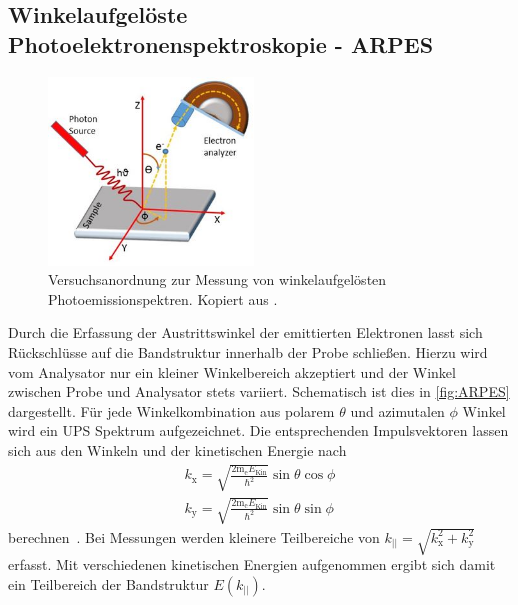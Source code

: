         \FloatBarrier
        \subsection{Winkelaufgelöste Photoelektronenspektroskopie - ARPES} \label{sec:ARPES}
            \begin{figure}
                \centering
                \includegraphics[height=5cm]{ARPES.jpg}
                \caption{Versuchsanordnung zur Messung von winkelaufgelösten Photoemissionspektren. Kopiert aus \cite{ARPES}.}
                \label{fig:ARPES}
            \end{figure}
            Durch die Erfassung der Austrittswinkel der emittierten Elektronen lasst sich Rückschlüsse auf die Bandstruktur innerhalb der Probe schließen.
            Hierzu wird vom Analysator nur ein kleiner Winkelbereich akzeptiert und der Winkel zwischen Probe und Analysator stets variiert.
            Schematisch ist dies in \autoref{fig:ARPES} dargestellt.
            Für jede Winkelkombination aus polarem $\theta$ und azimutalen $\phi$ Winkel wird ein UPS Spektrum aufgezeichnet.
            Die entsprechenden Impulsvektoren lassen sich aus den Winkeln und der kinetischen Energie nach
            \begin{gather}
                k_\text{x} = \sqrt{\frac{2 \text{m}_\text{e} E_\text{Kin}}{\hbar^2}} \sin\theta \cos\phi \\
                k_\text{y} = \sqrt{\frac{2 \text{m}_\text{e} E_\text{Kin}}{\hbar^2}} \sin\theta \sin\phi
            \end{gather}
            berechnen~\cite{MM_4}.
            Bei Messungen werden kleinere Teilbereiche von $k_\text{||} = \sqrt{k_\text{x}^2 + k_\text{y}^2}$ erfasst.
            Mit verschiedenen kinetischen Energien aufgenommen ergibt sich damit ein Teilbereich der Bandstruktur $E(k_\text{||})$.
